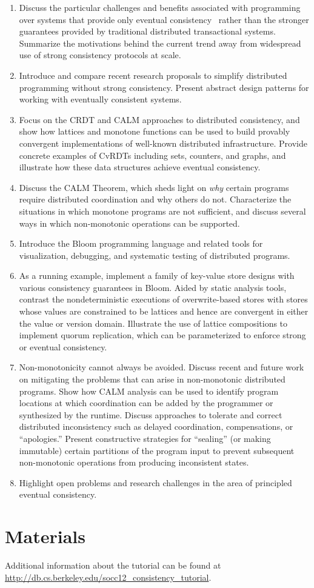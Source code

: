 \begin{enumerate}
\item
  Discuss the particular challenges and benefits associated with programming
  over systems that provide only eventual
  consistency~\cite{DeCandia2007,Terry1995,vogels} rather than the stronger
  guarantees provided by traditional distributed transactional systems.
  Summarize the motivations behind the current trend away from widespread use of
  strong consistency protocols at scale.
\item
  Introduce and compare recent research proposals to simplify distributed
  programming without strong consistency.  Present abstract design patterns
  for working with eventually consistent systems.
\item
  Focus on the CRDT and CALM approaches to distributed consistency, and show how
  lattices and monotone functions can be used to build provably convergent
  implementations of well-known distributed infrastructure.  Provide concrete
  examples of CvRDTs including sets, counters, and graphs, and illustrate how
  these data structures achieve eventual consistency.
\item
  Discuss the CALM Theorem, which sheds light on \emph{why} certain programs
  require distributed coordination and why others do not.  Characterize the
  situations in which monotone programs are not sufficient, and discuss several
  ways in which non-monotonic operations can be supported.
\item
  Introduce the Bloom programming language and related tools for visualization,
  debugging, and systematic testing of distributed programs.
\item
  As a running example, implement a family of key-value store designs with
  various consistency guarantees in Bloom.  Aided by static analysis tools,
  contrast the nondeterministic executions of overwrite-based stores with stores
  whose values are constrained to be lattices and hence are convergent in
  either the value or version domain.  Illustrate the use of lattice
  compositions to implement quorum replication, which can be parameterized to
  enforce strong or eventual consistency.
\item
  Non-monotonicity cannot always be avoided.  Discuss recent and future work on
  mitigating the problems that can arise in non-monotonic distributed programs.
  Show how CALM analysis can be used to identify program locations at which
  coordination can be added by the programmer or synthesized by the runtime.
  Discuss approaches to tolerate and correct distributed inconsistency such as
  delayed coordination, compensations, or ``apologies.''  Present constructive
  strategies for ``sealing'' (or making immutable) certain partitions of the
  program input to prevent subsequent non-monotonic operations from producing
  inconsistent states.
\item
  Highlight open problems and research challenges in the area of principled
  eventual consistency.
\end{enumerate}

\section{Materials}
Additional information about the tutorial can be found at
\url{http://db.cs.berkeley.edu/socc12_consistency_tutorial}.





